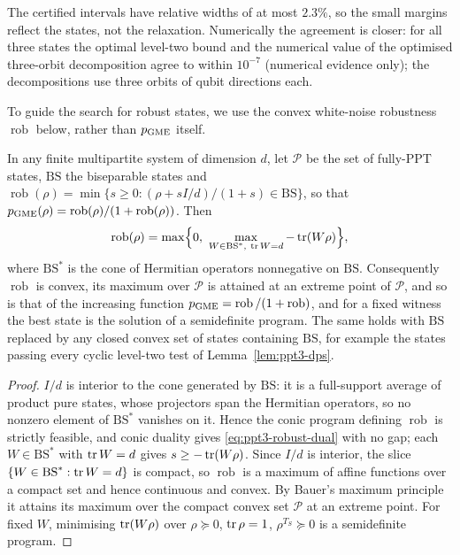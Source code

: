 The certified intervals have relative widths of at most $2.3\%$, so the small margins reflect the states, not the
relaxation. Numerically the agreement is closer: for all three states the optimal level-two bound and the numerical
value of the optimised three-orbit decomposition agree to within $10^{-7}$ (numerical evidence only); the decompositions use three orbits of qubit directions each.

To guide the search for robust states, we use the convex white-noise robustness $\operatorname{rob}$ below,
rather than $p_{\rm GME}$ itself.

\begin{proposition}\label{prop:ppt3-noise-extremal}
In any finite multipartite system of dimension $d$, let $\mathcal P$ be the set of fully-PPT states, $\mathrm{BS}$ the
biseparable states and $\operatorname{rob}(\rho)=\min\{s\ge0:(\rho+sI/d)/(1+s)\in\mathrm{BS}\}$, so that
$p_{\rm GME}(\rho)=\operatorname{rob}(\rho)/(1+\operatorname{rob}(\rho))$. Then
\begin{equation}\label{eq:ppt3-robust-dual}
 \operatorname{rob}(\rho)=\max\Bigl\{0,\ \max_{W\in\mathrm{BS}^*,\ \operatorname{tr} W=d}-\operatorname{tr}(W\rho)\Bigr\},
\end{equation}
where $\mathrm{BS}^*$ is the cone of Hermitian operators nonnegative on $\mathrm{BS}$. Consequently $\operatorname{rob}$ is convex,
its maximum over $\mathcal P$ is attained at an extreme point of $\mathcal P$, and so is that of the increasing function
$p_{\rm GME}=\operatorname{rob}/(1+\operatorname{rob})$, and for a fixed witness the best state is
the solution of a semidefinite program. The same holds with $\mathrm{BS}$ replaced by any closed convex set of states
containing $\mathrm{BS}$, for example the states passing every cyclic level-two test of Lemma~\ref{lem:ppt3-dps}.
\end{proposition}
\begin{proof}
$I/d$ is interior to the cone generated by $\mathrm{BS}$: it is a full-support average of product pure states, whose
projectors span the Hermitian operators, so no nonzero element of $\mathrm{BS}^*$ vanishes on it. Hence the conic program
defining $\operatorname{rob}$ is strictly feasible, and conic duality gives \eqref{eq:ppt3-robust-dual} with no gap; each
$W\in\mathrm{BS}^*$ with $\operatorname{tr} W=d$ gives $s\ge-\operatorname{tr}(W\rho)$. Since $I/d$ is interior, the slice
$\{W\in\mathrm{BS}^*:\operatorname{tr} W=d\}$ is compact, so $\operatorname{rob}$ is a maximum of affine functions over a compact set and hence
continuous and convex. By Bauer's maximum principle it attains its maximum over the compact convex set $\mathcal P$ at an
extreme point. For fixed $W$,
minimising $\operatorname{tr}(W\rho)$ over $\rho\succeq0$, $\operatorname{tr}\rho=1$, $\rho^{T_S}\succeq0$ is a semidefinite program.
\end{proof}

